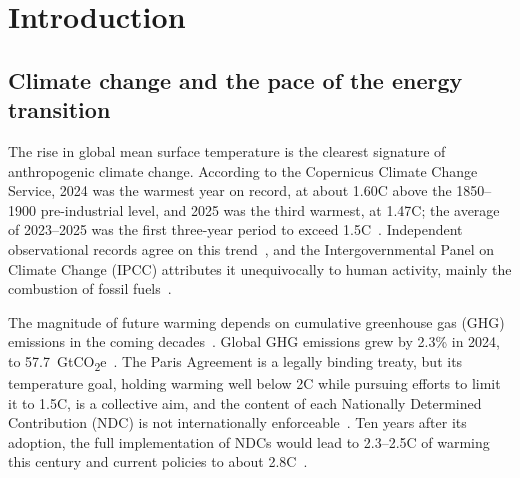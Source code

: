 
\chapter{Introduction}
\label{ch:introduction}

\section{Climate change and the pace of the energy transition}
\label{sec:climate}

The rise in global mean surface temperature is the clearest signature of anthropogenic climate change. According to the Copernicus Climate Change Service, 2024 was the warmest year on record, at about 1.60\textdegree{}C above the 1850--1900 pre-industrial level, and 2025 was the third warmest, at 1.47\textdegree{}C; the average of 2023--2025 was the first three-year period to exceed 1.5\textdegree{}C~\cite{copernicus_gch2025}. %
Independent observational records agree on this trend~\cite{NOAAClimateGlobalTemperature, Rohde2020, Hersbach2020, Lenssen2019}, and the Intergovernmental Panel on Climate Change (IPCC) attributes it unequivocally to human activity, mainly the combustion of fossil fuels~\cite{IPCC2023Synthesis}.

The magnitude of future warming depends on cumulative greenhouse gas (GHG) emissions in the coming decades~\cite{IPCC2023Synthesis}. Global GHG emissions grew by 2.3\% in 2024, to 57.7~GtCO\textsubscript{2}e~\cite{UNEP2025EmissionsGap}. %
The Paris Agreement is a legally binding treaty, but its temperature goal, holding warming well below 2\textdegree{}C while pursuing efforts to limit it to 1.5\textdegree{}C, is a collective aim, and the content of each Nationally Determined Contribution (NDC) is not internationally enforceable~\cite{unfccc_paris}. Ten years after its adoption, the full implementation of NDCs would lead to 2.3--2.5\textdegree{}C of warming this century and current policies to about 2.8\textdegree{}C~\cite{UNEP2025EmissionsGap}.

